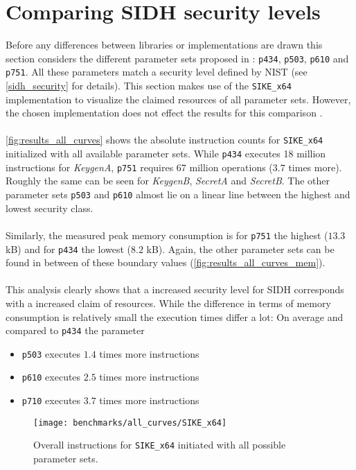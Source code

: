 \section{Comparing SIDH security levels}\label{sec:analysis_sidh_levels}

Before any differences between libraries or implementations are drawn this section considers the different parameter sets proposed in \parencite{sike2020spec}: \texttt{p434}, \texttt{p503}, \texttt{p610} and \texttt{p751}. All these parameters match a security level defined by NIST (see \autoref{sidh_security} for details). This section makes use of the \texttt{SIKE\_x64} implementation to visualize the claimed resources of all parameter sets. However, the chosen implementation does not effect the results for this comparison .\\\\
\autoref{fig:results_all_curves} shows the absolute instruction counts for \texttt{SIKE\_x64} initialized with all available parameter sets. While \texttt{p434} executes 18 million instructions for \textit{KeygenA}, \texttt{p751} requires 67 million operations ($3.7$ times more). Roughly the same can be seen for \textit{KeygenB}, \textit{SecretA} and \textit{SecretB}. The other parameter sets \texttt{p503} and \texttt{p610} almost lie on a linear line between the highest and lowest security class.\\\\
Similarly, the measured peak memory consumption is for \texttt{p751} the highest ($13.3$ kB) and for \texttt{p434} the lowest ($8.2$ kB). Again, the other parameter sets can be found in between of these boundary values (\autoref{fig:results_all_curves_mem}). \\\\
This analysis clearly shows that a increased security level for SIDH corresponds with a increased claim of resources. While the difference in terms of memory consumption is relatively small the execution times differ a lot: On average and compared to \texttt{p434} the parameter
\begin{itemize}
\item \texttt{p503} executes $1.4$ times more instructions
\item \texttt{p610} executes $2.5$ times more instructions
\item \texttt{p710} executes $3.7$ times more instructions
\end{itemize}

\begin{figure}[H]
  \centering
  \texttt{[image: benchmarks/all\_curves/SIKE\_x64]}
  \caption[Overall instructions for all parameter sets via \texttt{SIKE\_x64}]
  {Overall instructions for \texttt{SIKE\_x64} initiated with all possible parameter sets.}
  \label{fig:results_all_curves}
\end{figure}

